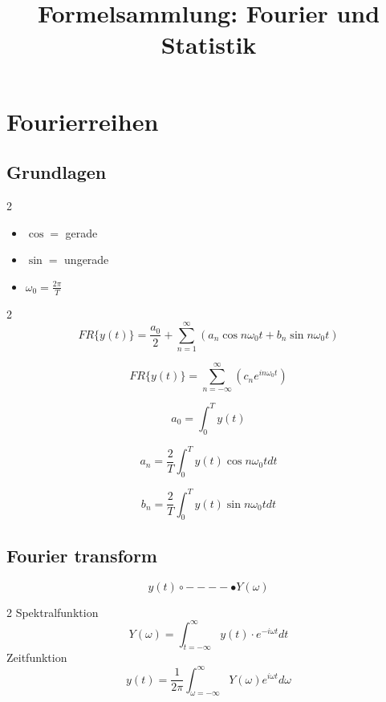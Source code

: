 \documentclass{article}
\title{Formelsammlung: Fourier und Statistik}
\author{}
\date{}
\begin{document}
\maketitle

\section*{Fourierreihen}
\subsection*{Grundlagen}
\begin{multicols}{2}
    

\begin{itemize}
    \item $\cos =$ gerade
    \item $\sin =$ ungerade
    \item $\omega_0 = \frac{2\pi}{T}$
\end{itemize}
\end{multicols}
\begin{multicols}{2}
    \begin{equation*}
        FR\{y(t)\}=\frac{a_0}2+\sum_{n=1}^{\infty}(a_n \cos n\omega_0 t+b_n \sin n\omega_0 t)
    \end{equation*}

    \begin{equation*}
        FR\{y(t)\}=\sum_{n=-\infty}^{\infty}(c_n e^{i n \omega_0 t})
    \end{equation*}

    \begin{equation*}
        a_0=\int_{0}^{T}y(t)
    \end{equation*}

    \begin{equation*}
        a_n=\frac2{T}\int_{0}^{T}y(t)\cos n\omega_0t dt
    \end{equation*}
    
    \begin{equation*}
        b_n=\frac2{T}\int_{0}^{T}y(t)\sin n\omega_0t dt
    \end{equation*}
    \end{multicols}
\subsection*{Fourier transform}
\begin{equation*}
    y(t)\circ ---- \bullet Y(\omega)
\end{equation*}
\begin{multicols}{2}
    Spektralfunktion
    \begin{equation*}
        Y(\omega)=\int_{t=-\infty}^{\infty}y(t)\cdot e^{-i\omega t}dt
    \end{equation*}
    Zeitfunktion
    \begin{equation*}
        y(t)=\frac1{2\pi}\int_{\omega=-\infty}^{\infty}Y(\omega)e^{i\omega t}d\omega
    \end{equation*}
    \end{multicols}
\end{document}
